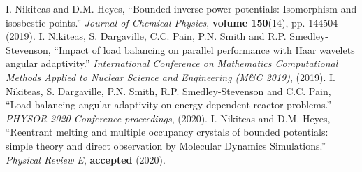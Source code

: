 \begingroup
\renewcommand{\section}[2]{}%
\begin{thebibliography}{}%
    I. Nikiteas and D.M. Heyes,
    ``Bounded inverse power potentials: Isomorphism and isosbestic points.''\newline
    \textit{Journal of Chemical Physics}, \textbf{volume 150}(14), pp. 144504 (2019).
    \newline \newline
    I. Nikiteas, S. Dargaville, C.C. Pain, P.N. Smith and R.P. Smedley-Stevenson,
    ``Impact of load balancing on parallel performance with Haar wavelets angular adaptivity.''
    \textit{International Conference on Mathematics Computational Methods Applied
    to Nuclear Science and Engineering (M\&C 2019)}, (2019).
    \newline \newline
    I. Nikiteas, S. Dargaville, P.N. Smith,  R.P. Smedley-Stevenson and C.C. Pain,
    ``Load balancing angular adaptivity on energy dependent reactor problems.''
    \textit{PHYSOR 2020 Conference proceedings}, (2020).
    \newline \newline
    I. Nikiteas and D.M. Heyes,
    ``Reentrant melting and multiple occupancy crystals of bounded
    potentials: simple theory and direct observation by Molecular
    Dynamics Simulations.'' \textit{Physical Review E}, \textbf{accepted} (2020).
\end{thebibliography}
%
%

